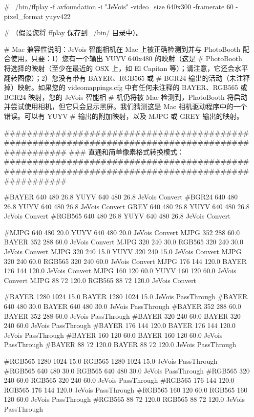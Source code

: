 \begin{DoxyVerb}
#   ~/bin/ffplay -f avfoundation -i "JeVois" -video_size 640x300 -framerate 60 -pixel_format yuyv422

# （假设您将 ffplay 保存到 ~/bin/ 目录中）。

# Mac 兼容性说明：JeVois 智能相机在 Mac 上被正确检测到并与 PhotoBooth 配合使用，只要：1）您有一个输出 YUYV 640x480 的映射（这是 
# PhotoBooth 将选择的映射（至少在最近的 OSX 上，如 El Capitan 等）；请注意，它还会水平翻转图像）；2）您没有带有 BAYER、RGB565 或 
# BGR24 输出的活动（未注释掉）映射。如果您的 videomappings.cfg 中有任何未注释的 BAYER、RGB565 或 BGR24 映射，您的 JeVois 智能相
# 机仍将被 Mac 检测到，PhotoBooth 将启动并尝试使用相机，但它只会显示黑屏。我们猜测这是 Mac 相机驱动程序中的一个错误。可以有 YUYV 
# 输出的附加映射，以及 MJPG 或 GREY 输出的映射。

################################################################################################# 
### 直通和简单像素格式转换模式：
#################################################################################################

#BAYER 640 480 26.8 YUYV 640 480 26.8 JeVois Convert
#BGR24 640 480 26.8 YUYV 640 480 26.8 JeVois Convert
GREY 640 480 26.8 YUYV 640 480 26.8 JeVois Convert
#RGB565 640 480 26.8 YUYV 640 480 26.8 JeVois Convert

#MJPG 640 480 20.0 YUYV 640 480 20.0 JeVois Convert
MJPG 352 288 60.0 BAYER 352 288 60.0 JeVois Convert
MJPG 320 240 30.0 RGB565 320 240 30.0 JeVois Convert
MJPG 320 240 15.0 YUYV 320 240 15.0 JeVois Convert
MJPG 320 240 60.0 RGB565 320 240 60.0 JeVois Convert
MJPG 176 144 120.0 BAYER 176 144 120.0 JeVois Convert
MJPG 160 120 60.0 YUYV 160 120 60.0 JeVois Convert
MJPG 88 72 120.0 RGB565 88 72 120.0 JeVois Convert

#BAYER 1280 1024 15.0 BAYER 1280 1024 15.0 JeVois PassThrough
#BAYER 640 480 30.0 BAYER 640 480 30.0 JeVois PassThrough
#BAYER 352 288 60.0 BAYER 352 288 60.0 JeVois PassThrough
#BAYER 320 240 60.0 BAYER 320 240 60.0 JeVois PassThrough
#BAYER 176 144 120.0 BAYER 176 144 120.0 JeVois PassThrough
#BAYER 160 120 60.0 BAYER 160 120 60.0 JeVois PassThrough
#BAYER 88 72 120.0 BAYER 88 72 120.0 JeVois PassThrough

#RGB565 1280 1024 15.0 RGB565 1280 1024 15.0 JeVois PassThrough
#RGB565 640 480 30.0 RGB565 640 480 30.0 JeVois PassThrough
#RGB565 320 240 60.0 RGB565 320 240 60.0 JeVois PassThrough
#RGB565 176 144 120.0 RGB565 176 144 120.0 JeVois PassThrough
#RGB565 160 120 60.0 RGB565 160 120 60.0 JeVois PassThrough
#RGB565 88 72 120.0 RGB565 88 72 120.0 JeVois PassThrough


\end{DoxyVerb}
